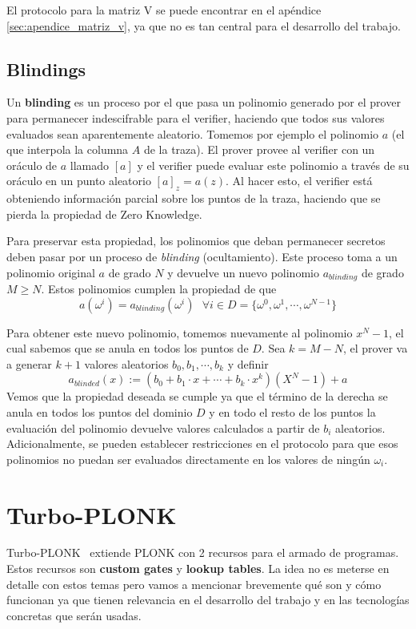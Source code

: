 El protocolo para la matriz V se puede encontrar en el apéndice \ref{sec:apendice_matriz_v}, ya que no es tan central para el desarrollo del trabajo. 


\subsection{Blindings}\label{sec:blinding}
Un \textbf{blinding}\cite{saarinen2018arithmetic} es un proceso por el que pasa un polinomio generado por el prover para permanecer indescifrable para el verifier, haciendo que todos sus valores evaluados sean aparentemente aleatorio. Tomemos por ejemplo el polinomio $a$ (el que interpola la columna $A$ de la traza). El prover provee al verifier con un oráculo de $a$ llamado $[a]$ y el verifier puede evaluar este polinomio a través de su oráculo en un punto aleatorio $[a]_z = a(z)$. Al hacer esto, el verifier está obteniendo información parcial sobre los puntos de la traza, haciendo que se pierda la propiedad de Zero Knowledge.

Para preservar esta propiedad, los polinomios que deban permanecer secretos deben pasar por un proceso de \textit{blinding} (ocultamiento). Este proceso toma a un polinomio original $a$ de grado $N$ y devuelve un nuevo polinomio $a_{blinding}$ de grado $M \geq N$. Estos polinomios cumplen la propiedad de que 
$$a(\omega^i) = a_{blinding}(\omega^i) ~~~ \forall i \in D=\{\omega^0, \omega^1, \cdots,  \omega^{N-1}\}$$

Para obtener este nuevo polinomio, tomemos nuevamente al polinomio $x^N-1$, el cual sabemos que se anula en todos los puntos de $D$. Sea $k = M-N$, el prover va a generar $k+1$ valores aleatorios $b_0, b_1, \cdots, b_k$ y definir 
$$a_{blinded}(x) := (b_0 + b_1\cdot x + \cdots + b_k \cdot x^k)(X^N-1) + a$$
Vemos que la propiedad deseada se cumple ya que el término de la derecha se anula en todos los puntos del dominio $D$ y en todo el resto de los puntos la evaluación del polinomio devuelve valores calculados a partir de $b_i$ aleatorios. Adicionalmente, se pueden establecer restricciones en el protocolo para que esos polinomios no puedan ser evaluados directamente en los valores de ningún $\omega_i$.


\section{Turbo-PLONK}\label{sec:turbo_plonk}
Turbo-PLONK~\cite{gabizon2020proposal} extiende PLONK con 2 recursos para el armado de programas. Estos recursos son \textbf{custom gates} y \textbf{lookup tables}. La idea no es meterse en detalle con estos temas pero vamos a mencionar brevemente qué son y cómo funcionan ya que tienen relevancia en el desarrollo del trabajo y en las tecnologías concretas que serán usadas.

